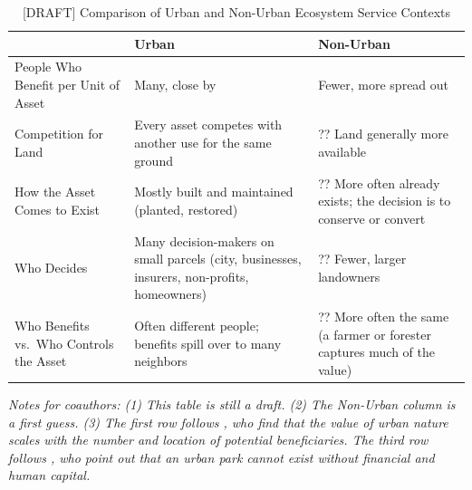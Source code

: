 \documentclass[12pt]{article}
\begin{document}
\begin{itemize}
  \begin{table}[h!]
    \centering
    \caption{[DRAFT] Comparison of Urban and Non-Urban Ecosystem Service Contexts}
    \begin{tabular}{>{\raggedright\arraybackslash}p{4.2cm} >{\raggedright\arraybackslash}p{4.8cm} >{\raggedright\arraybackslash}p{4.8cm}}
      \toprule
      & Urban & Non-Urban \\
      \midrule
      People Who Benefit per Unit of Asset & Many, close by & Fewer, more spread out \\
      Competition for Land & Every asset competes with another use for the same ground & ?? Land generally more available \\
      How the Asset Comes to Exist & Mostly built and maintained (planted, restored) & ?? More often already exists; the decision is to conserve or convert \\
      Who Decides & Many decision-makers on small parcels (city, businesses, insurers, non-profits, homeowners) & ?? Fewer, larger landowners \\
      Who Benefits vs.\ Who Controls the Asset & Often different people; benefits spill over to many neighbors & ?? More often the same (a farmer or forester captures much of the value) \\
      \bottomrule
    \end{tabular}
    \begin{minipage}[t]{0.8\textwidth}
      \justifying
      \footnotesize \noindent \textit{Notes for coauthors: (1) This table is still a draft. (2) The Non-Urban column is a first guess. (3) The first row follows \citet{keelerSocialecologicalTechnologicalFactors2019}, who find that the value of urban nature scales with the number and location of potential beneficiaries. The third row follows \citet{tanConceptualFrameworkUntangle2020}, who point out that an urban park cannot exist without financial and human capital. }
    \end{minipage}
    \label{tab:urban_vs_nonurban}
  \end{table}
\end{itemize} 

\end{document}
